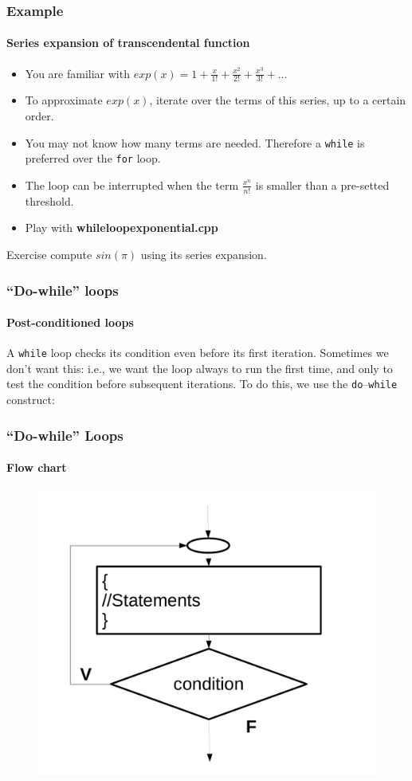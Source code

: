 \documentclass[12pt]{beamer}
\begin{document}
\begin{frame}
  \frametitle{Example}
  \framesubtitle{Series expansion of transcendental function}
\begin{itemize}
    \item You are familiar with $exp(x) = 1+\frac{x}{1!} +\frac{x^2}{2!}+\frac{x^3}{3!} + \ldots$
    \item To approximate $exp(x)$, iterate over the terms of this series, up to a certain order.
    \item You may not know how many terms are needed. Therefore a \lstinline/while/ is preferred over the \lstinline/for/ loop.  
    \item The loop can be interrupted when the term $\frac{x^n}{n!}$ is smaller than a pre-setted threshold.
    \item Play with \textbf{whileloopexponential.cpp} %
\end{itemize}
\begin{alertblock}{Exercise}
 compute $ sin(\pi)$ using its series expansion.
\end{alertblock}
\end{frame}



\begin{frame}
	\frametitle{``Do-while'' loops}
	\framesubtitle{Post-conditioned loops}
	A \lstinline/while/ loop checks its condition even before its first iteration. Sometimes we don't want this: i.e., we want the loop always to run the first time, and only to test the condition before subsequent iterations. To do this, we use the \lstinline/do/--\lstinline/while/ construct:
	\LstDoWhile
\end{frame}


\begin{frame}
\frametitle{``Do-while'' Loops}
\framesubtitle{Flow chart}
\LstDoWhileLine
\begin{figure}
    \includegraphics[height=0.7\textheight]{../figures/do_while_loop}
\end{figure}
\end{frame}
\end{document}
